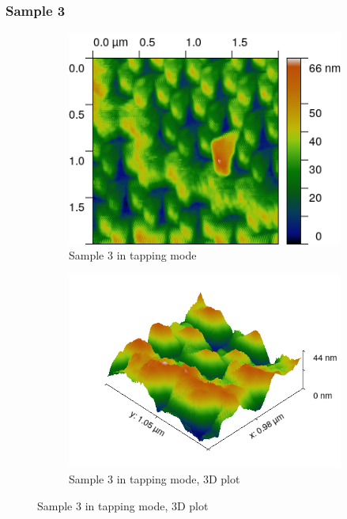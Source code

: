 \documentclass[11pt,a4paper]{article}
\begin{document}
\subsubsection{Sample 3}

\begin{figure}[H]
\centering
\begin{subfigure}[b]{0.45\textwidth}
\includegraphics[width=\textwidth]{tm_sample3}
\caption{Sample 3 in tapping mode}
\label{fig:}
\end{subfigure}
\begin{subfigure}[b]{0.45\textwidth}
\includegraphics[width=\textwidth]{tm_sample3_3D}
\caption{Sample 3 in tapping mode, 3D plot}
\label{fig:}
\end{subfigure}
\end{figure}
\end{document}

